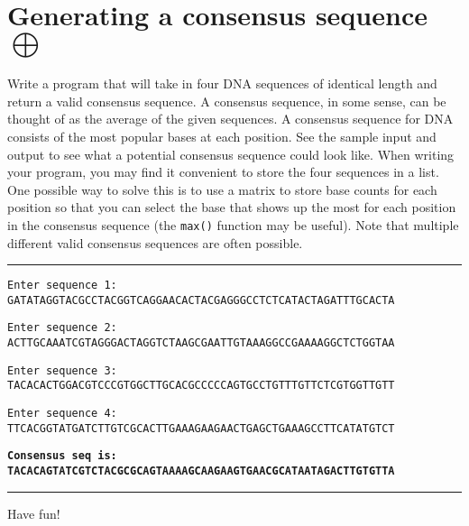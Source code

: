 \documentclass[12pt, letterpaper]{article}
\begin{document}
\section{\upshape Generating a consensus sequence $\bigoplus$}
Write a program that will take in four DNA sequences of identical length and return a valid consensus sequence. A consensus sequence, in some sense, can be thought of as the average of the given sequences. A consensus sequence for DNA consists of the most popular bases at each position. See the sample input and output to see what a potential consensus sequence could look like. When writing your program, you may find it convenient to store the four sequences in a list. One possible way to solve this is to use a matrix to store base counts for each position so that you can select the base that shows up the most for each position in the consensus sequence (the \texttt{max()} function may be useful). Note that multiple different valid consensus sequences are often possible.

\vspace{2mm}\hrule\vspace{2mm}

\texttt{Enter sequence 1: GATATAGGTACGCCTACGGTCAGGAACACTACGAGGGCCTCTCATACTAGATTTGCACTA}

\texttt{Enter sequence 2: ACTTGCAAATCGTAGGGACTAGGTCTAAGCGAATTGTAAAGGCCGAAAAGGCTCTGGTAA}

\texttt{Enter sequence 3: TACACACTGGACGTCCCGTGGCTTGCACGCCCCCAGTGCCTGTTTGTTCTCGTGGTTGTT}

\texttt{Enter sequence 4: TTCACGGTATGATCTTGTCGCACTTGAAAGAAGAACTGAGCTGAAAGCCTTCATATGTCT}

\texttt{\bfseries Consensus seq is: TACACAGTATCGTCTACGCGCAGTAAAAGCAAGAAGTGAACGCATAATAGACTTGTGTTA}

\vspace{2mm}\hrule\vspace{2mm}

Have fun!
\end{document}
